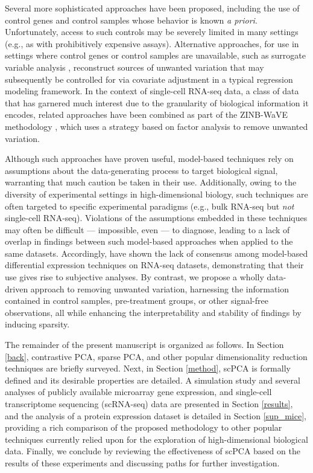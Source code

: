 Several more sophisticated approaches have been proposed, including the use of control genes \citep{gagnon2012using, risso2014normalization} and control samples \citep{gagnon2013removing} whose behavior is known \textit{a priori}. Unfortunately, access to such controls may be severely limited in many settings (e.g., as with prohibitively expensive assays). Alternative approaches, for use in settings where control genes or control samples are unavailable, such as surrogate variable analysis \citep{leek2007capturing}, reconstruct sources of unwanted variation that may subsequently be controlled for via covariate adjustment in a typical regression modeling framework. In the context of single-cell RNA-seq data, a class of data that has garnered much interest due to the granularity of biological information it encodes, related approaches have been combined as part of the ZINB-WaVE methodology \citep{risso2017zinb}, which uses a strategy based on factor analysis to remove unwanted variation.

Although such approaches have proven useful, model-based techniques rely on assumptions about the data-generating process to target biological signal, warranting that much caution be taken in their use. Additionally, owing to the diversity of experimental settings in high-dimensional biology, such techniques are often targeted to specific experimental paradigms (e.g., bulk RNA-seq but \textit{not} single-cell RNA-seq). Violations of the assumptions embedded in these techniques may often be difficult --- impossible, even --- to diagnose, leading to a lack of overlap in findings between such model-based approaches when applied to the same datasets. Accordingly, \citet{zhang2014} have shown the lack of consensus among model-based differential expression techniques on RNA-seq datasets, demonstrating that their use gives rise to subjective analyses. By contrast, we propose a wholly data-driven approach to removing unwanted variation, harnessing the information contained in control samples, pre-treatment groups, or other signal-free observations, all while enhancing the interpretability and stability of findings by inducing sparsity.

The remainder of the present manuscript is organized as follows. In Section \ref{back}, contrastive PCA, sparse PCA, and other popular dimensionality reduction techniques are briefly surveyed. Next, in Section \ref{method}, scPCA is formally defined and its desirable properties are detailed. A simulation study and several analyses of publicly available  microarray gene expression, and single-cell transcriptome sequencing (scRNA-seq) data are presented in Section \ref{results}, and the analysis of a protein expression dataset is detailed in Section \ref{sup_mice}, providing a rich comparison of the proposed methodology to other popular techniques currently relied upon for the exploration of high-dimensional biological data. Finally, we conclude by reviewing the effectiveness of scPCA based on the results of these experiments and discussing paths for further investigation. 

